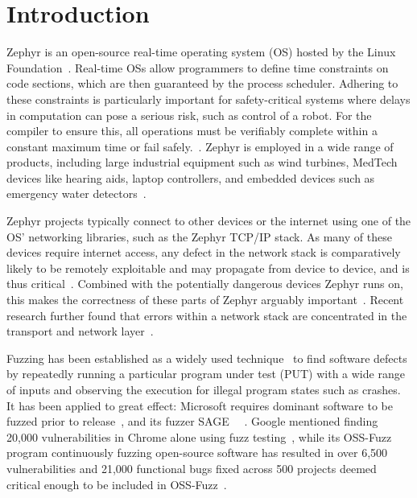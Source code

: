 \documentclass[twocolumn]{article}
\let\savedCite=\cite
\renewcommand{\cite}{\unskip~\savedCite}
\begin{document}
\clearpage\newpage
\onecolumn

\tableofcontents
\clearpage\newpage
\twocolumn
{}


\section{Introduction}
\label{Introduction}

Zephyr is an open-source real-time operating system (OS) hosted by the Linux Foundation\cite{ZephyrAbout}. Real-time OSs allow programmers to define time constraints on code sections, which are then guaranteed by the process scheduler. Adhering to these constraints is particularly important for safety-critical systems where delays in computation can pose a serious risk, such as control of a robot. For the compiler to ensure this, all operations must be verifiably complete within a constant maximum time or fail safely.\cite{RTOSWiki}. Zephyr is employed in a wide range of products, including large industrial equipment such as wind turbines, MedTech devices like hearing aids, laptop controllers, and embedded devices such as emergency water detectors\cite{ZephyrUsedIn}.

Zephyr projects typically connect to other devices or the internet using one of the OS' networking libraries, such as the Zephyr TCP/IP stack. As many of these devices require internet access, any defect in the network stack is comparatively likely to be remotely exploitable and may propagate from device to device, and is thus critical\cite{Fuzzware}. Combined with the potentially dangerous devices Zephyr runs on, this makes the correctness of these parts of Zephyr arguably important\cite{Tardis}. Recent research further found that errors within a network stack are concentrated in the transport and network layer\cite{NetworkBugsReview}.

Fuzzing has been established as a widely used technique\cite{Demystifying} to find software defects by repeatedly running a particular program under test (PUT) with a wide range of inputs and observing the execution for illegal program states such as crashes. It has been applied to great effect: Microsoft requires dominant software to be fuzzed prior to release\cite{Demystifying}, and its fuzzer SAGE\cite{SAGE} \cite{FuzzingTheStateOfTheArt}. Google mentioned finding 20,000 vulnerabilities in Chrome alone using fuzz testing\cite{Demystifying}, while its OSS-Fuzz program continuously fuzzing open-source software has resulted in over 6,500 vulnerabilities and 21,000 functional bugs fixed across 500 projects deemed critical enough to be included in OSS-Fuzz\cite{ClusterFuzzLite}.
\end{document}
